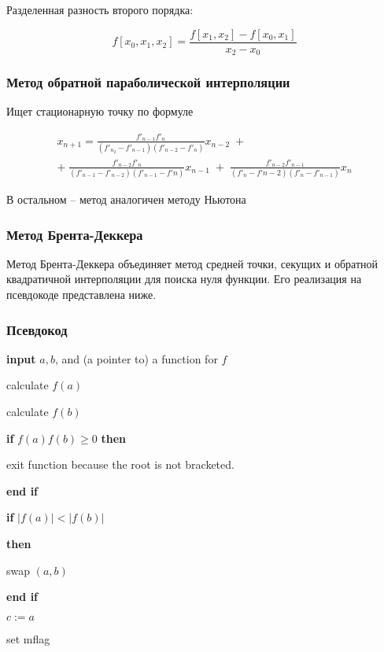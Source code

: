 \documentclass[a4paper,12pt]{article}
\begin{document}
Разделенная разность второго порядка:

\begin{equation*}
f[x_0,x_1,x_2] = \frac{f[x_1,x_2] - f[x_0,x_1]}{x_2 - x_0}
\end{equation*}

\subsubsection*{Метод обратной параболической интерполяции}

Ищет стационарную точку по формуле

\begin{multline*}
x_{n+1} = \frac{f'_{n-1}f'_{n}}{(f'_{n_2} - f'_{n - 1})(f'_{n - 2} - f'_{n})}x_{n-2} \; + \\ + \; \frac{f'_{n-2}f'_{n}}{(f'_{n-1} - f'_{n - 2})(f'_{n-1} - f'{n})}x_{n-1} \;+\; \frac{f'_{n-2}f'_{n-1}}{(f'_{n} - f'{n-2})(f'_n - f'_{n-1})}x_n
\end{multline*}

В остальном -- метод аналогичен методу Ньютона

\subsubsection*{Метод Брента-Деккера}

Метод Брента-Деккера объединяет метод средней точки, секущих и обратной квадратичной интерполяции для поиска нуля функции. Его реализация на псевдокоде представлена ниже.


\noindent 
\subsubsection*{Псевдокод}


\textbf{input} $a, b$, and (a pointer to) a function for $f$

calculate $f(a)$

calculate $f(b)$


\textbf{if} $f(a)f(b) \geq 0$ 
\textbf{then}

\quad exit function because the root is not bracketed.


\textbf{end if}


\textbf{if} $|f(a)| < |f(b)|$ 

\textbf{then}

\quad swap $(a,b)$

\textbf{end if}

$c := a$

set mflag
\end{document}
